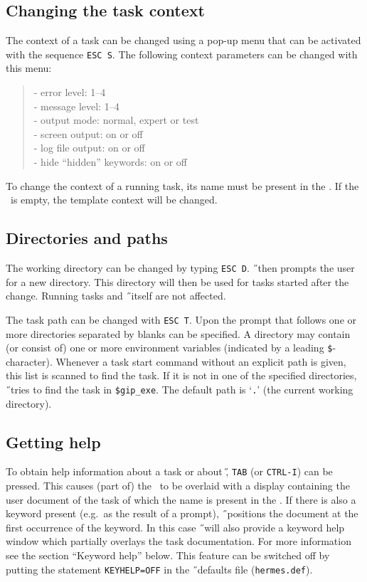 \subsection*{Changing the task context}
The context of a task can be changed using a pop-up menu that can be activated
with the sequence {\tt ESC S}.\label{escs}
The following context parameters can be changed with this menu:
\begin{verse}
- error level: 1--4\\
- message level: 1--4\\
- output mode: normal, expert or test\\
- screen output: on or off\\
- log file output: on or off\\
- hide ``hidden'' keywords: on or off\\
\end{verse}
To change the context of a running task, its name must be present in the \UCA.
If the \UCA\ is empty, the template context will be changed.

\subsection*{Directories and paths}
The working directory can be changed by typing {\tt ESC D}.\label{escd}
\H\ then prompts the user for a new directory.
This directory will then be used for tasks started after the change.
Running tasks and \H\ itself are not affected.

The task path can be changed with {\tt ESC T}.\label{esct}
Upon the prompt that follows one or more directories
separated by blanks can be specified.
A directory may contain (or consist of) one or more environment variables
(indicated by a leading {\tt \$}-character).
Whenever a task start command without an explicit path is given,
this list is scanned to find the task.
If it is not in one of the specified directories, \H\ tries to find the task in
{\tt \$gip\_exe}.
The default path is `{\tt .}' (the current working directory).

\subsection*{Getting help}
To obtain help information about a task or about \H, {\tt TAB} (or {\tt CTRL-I})
\label{ctrli} can be pressed.
This causes (part of) the \COA\ to be overlaid with a display containing the
user document of the task of which the name is present in the \UCA .
If there is also a keyword present (e.g.\ as the result of a prompt),
\H\ positions the document at the first occurrence of the keyword.
In this case \H\ will also provide a keyword help window which partially
overlays the task documentation. For more information see the section
``Keyword help'' below. This feature can be switched off by putting the
statement {\tt KEYHELP=OFF} in the \H\ defaults file ({\tt hermes.def}).

